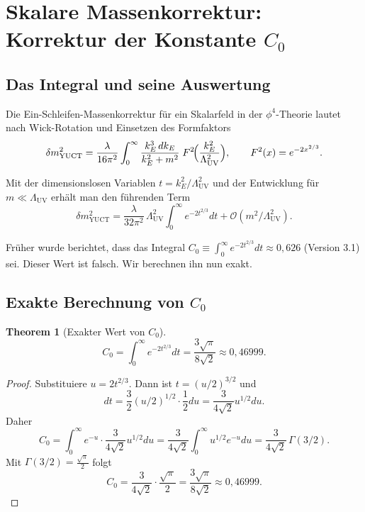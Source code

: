 \documentclass[11pt,a4paper]{article}
\newcommand{\LUV}{\Lambda_{\mathrm{UV}}}
\newtheorem{theorem}{Theorem}[section]
\theoremstyle{remark}
\begin{document}
	\section{Skalare Massenkorrektur: Korrektur der Konstante \(C_0\)}
	\label{sec:scalar}
	
	\subsection{Das Integral und seine Auswertung}
	
	Die Ein-Schleifen-Massenkorrektur für ein Skalarfeld in der \(\phi^4\)-Theorie lautet nach Wick-Rotation und Einsetzen des Formfaktors
	\begin{equation}
		\delta m^2_{\mathrm{YUCT}} = \frac{\lambda}{16\pi^2} \int_0^{\infty} \frac{k_E^3\, dk_E}{k_E^2 + m^2}\; F^2\!\Bigl(\frac{k_E^2}{\LUV^2}\Bigr), \qquad F^2(x) = e^{-2x^{2/3}}.
		\label{eq:scalar_YUCT}
	\end{equation}
	
	Mit der dimensionslosen Variablen \(t = k_E^2/\LUV^2\) und der Entwicklung für \(m \ll \LUV\) erhält man den führenden Term
	\begin{equation}
		\delta m^2_{\mathrm{YUCT}} = \frac{\lambda}{32\pi^2}\,\LUV^2 \int_0^{\infty} e^{-2t^{2/3}} dt + \mathcal{O}(m^2/\LUV^2).
		\label{eq:scalar_lead}
	\end{equation}
	
	Früher wurde berichtet, dass das Integral \(C_0 \equiv \int_0^{\infty} e^{-2t^{2/3}} dt \approx 0,626\) (Version 3.1) sei. Dieser Wert ist falsch. Wir berechnen ihn nun exakt.
	
	\subsection{Exakte Berechnung von \(C_0\)}
	
	\begin{theorem}[Exakter Wert von \(C_0\)]
		\label{thm:C0}
		\[
		C_0 = \int_0^{\infty} e^{-2t^{2/3}} dt = \frac{3\sqrt{\pi}}{8\sqrt{2}} \approx 0,46999.
		\]
	\end{theorem}
	
	\begin{proof}
		Substituiere \(u = 2t^{2/3}\). Dann ist \(t = (u/2)^{3/2}\) und
		\[
		dt = \frac{3}{2} (u/2)^{1/2} \cdot \frac{1}{2} du = \frac{3}{4\sqrt{2}} u^{1/2} du.
		\]
		Daher
		\[
		C_0 = \int_0^{\infty} e^{-u} \cdot \frac{3}{4\sqrt{2}} u^{1/2} du = \frac{3}{4\sqrt{2}} \int_0^{\infty} u^{1/2} e^{-u} du = \frac{3}{4\sqrt{2}} \, \Gamma(3/2).
		\]
		Mit \(\Gamma(3/2) = \frac{\sqrt{\pi}}{2}\) folgt
		\[
		C_0 = \frac{3}{4\sqrt{2}} \cdot \frac{\sqrt{\pi}}{2} = \frac{3\sqrt{\pi}}{8\sqrt{2}} \approx 0,46999.
		\]
	\end{proof}
	
\end{document}
